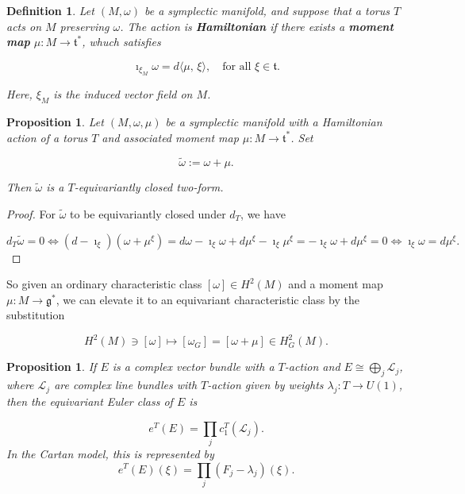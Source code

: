 \documentclass{article}
\newtheorem{prop}[theorem]{Proposition}
\newtheorem{defn}[theorem]{Definition\rm}
\newcommand{\ra}{\rightarrow}
\newcommand{\w}{\omega}
\newcommand{\mcL}{\mathcal{L}}
\newcommand{\mfg}{\mathfrak{g}}
\newcommand{\mft}{\mathfrak{t}}
\begin{document}
\begin{defn}
	Let $(M, \w)$ be a symplectic manifold, and suppose that a torus $T$ acts on $M$ preserving $\w$. The action is \textbf{Hamiltonian} if there exists a \textbf{moment map} $\mu : M \ra \mft^{\ast}$, whuch satisfies
	
	\begin{equation*}
		\imath_{\xi_{M}}\w = d\langle \mu,\, \xi \rangle, \quad \text{for all } \xi \in \mft.
	\end{equation*}

	Here, $\xi_{M}$ is the induced vector field on $M$.
\end{defn}

\begin{prop}
	Let $(M, \w, \mu)$ be a symplectic manifold with a Hamiltonian action of a torus $T$ and associated moment map $\mu : M \ra \mft^{\ast}$. Set
	
	\begin{equation*}
		\tilde{\w} := \w + \mu.
	\end{equation*}
	
	Then $\tilde{\w}$ is a $T$-equivariantly closed two-form.
\end{prop}

\begin{proof}
	For $\tilde{\w}$ to be equivariantly closed under $d_{T}$, we have
	
	\begin{equation*}
		d_{T}\tilde{\w} = 0 \iff (d - \imath_{\xi})(\w + \mu^{\xi}) = d\w - \imath_{\xi}\w + d\mu^{\xi} - \imath_{\xi}\mu^{\xi} = -\imath_{\xi}\w + d\mu^{\xi} = 0 \iff \imath_{\xi}\w = d\mu^{\xi}.
	\end{equation*}
\end{proof}

So given an ordinary characteristic class $[\w] \in H^{2}(M)$ and a moment map $\mu : M \ra \mfg^{\ast}$, we can elevate it to an equivariant characteristic class by the substitution

\begin{equation*}
		H^{2}(M) \ni [\w] \longmapsto [\w_{G}] = [\w + \mu] \in H_{G}^{2}(M).
\end{equation*}

\newpage

\begin{prop}
	If $E$ is a complex vector bundle with a $T$-action and $E \cong \bigoplus_{j} \mcL_{j}$, where $\mcL_{j}$ are complex line bundles with $T$-action given by weights $\lambda_{j} : T \ra U(1)$, then the equivariant Euler class of $E$ is
	
	\begin{equation*}
		e^{T}(E) = \prod\limits_{j} c_{1}^{T}(\mcL_{j}).
	\end{equation*}
	In the Cartan model, this is represented by
	\begin{equation*}
		e^{T}(E)(\xi) = \prod\limits_{j} (F_{j} - \lambda_{j})(\xi).
	\end{equation*}
\end{prop}
\end{document}
